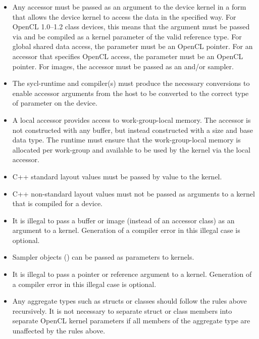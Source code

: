 \begin{itemize}
  \item
    Any accessor must be passed as an argument to the device kernel in
    a form that allows the device kernel to access the data in the
    specified way. For OpenCL 1.0--1.2 class devices, this means that
    the argument must be passed via  and be
    compiled as a kernel parameter of the valid reference type. For
    global shared data access, the parameter must be an OpenCL
     pointer. For an accessor that specifies OpenCL
     access, the parameter must be an OpenCL
     pointer. For images, the accessor must be passed as
    an  and/or sampler.

  \item
    The \gls{sycl-runtime} and compiler(s) must produce the necessary
    conversions to enable accessor arguments from the host to be
    converted to the correct type of parameter on the device.

  \item
    A local accessor provides access to work-group-local memory. The
    accessor is not constructed with any buffer, but instead
    constructed with a size and base data type. The runtime must
    ensure that the work-group-local memory is allocated per
    work-group and available to be used by the kernel via the local
    accessor.

  \item
    C++ standard layout values must be passed by value to the kernel.

  \item
    C++ non-standard layout values must not be passed as arguments to
    a kernel that is compiled for a device.

  \item
    It is illegal to pass a buffer or image (instead of an accessor
    class) as an argument to a kernel. Generation of a compiler error
    in this illegal case is optional.

  \item
    Sampler objects () can be passed as
    parameters to kernels.

  \item
    It is illegal to pass a pointer or reference argument to a
    kernel. Generation of a compiler error in this illegal case is
    optional.  \item Any aggregate types such as structs or classes
    should follow the rules above recursively. It is not necessary to
    separate struct or class members into separate OpenCL kernel
    parameters if all members of the aggregate type are unaffected by
    the rules above.

\end{itemize}

